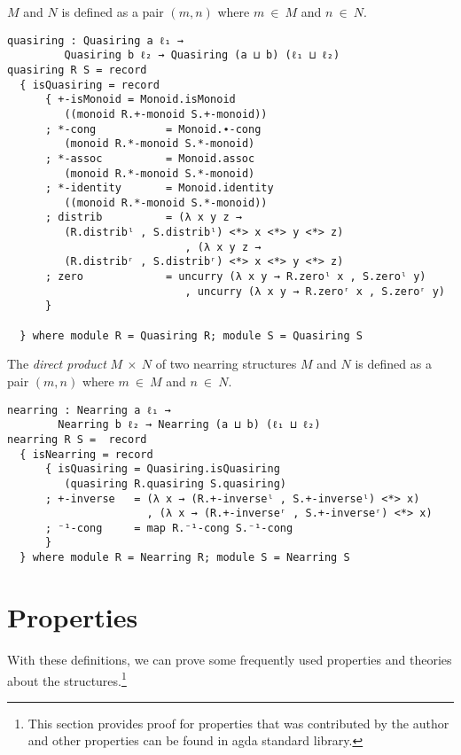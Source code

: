 $M$ and $N$ is defined as a pair $(m,n)$ where $m \ \in \ M$ and $n \ \in \ N$.
\begin{verbatim}
quasiring : Quasiring a ℓ₁ →
		 Quasiring b ℓ₂ → Quasiring (a ⊔ b) (ℓ₁ ⊔ ℓ₂)
quasiring R S = record
  { isQuasiring = record
      { +-isMonoid = Monoid.isMonoid
		 ((monoid R.+-monoid S.+-monoid))
      ; *-cong           = Monoid.∙-cong
		 (monoid R.*-monoid S.*-monoid)
      ; *-assoc          = Monoid.assoc
		 (monoid R.*-monoid S.*-monoid)
      ; *-identity       = Monoid.identity
		 ((monoid R.*-monoid S.*-monoid))
      ; distrib          = (λ x y z →
		 (R.distribˡ , S.distribˡ) <*> x <*> y <*> z)
                            , (λ x y z →
		 (R.distribʳ , S.distribʳ) <*> x <*> y <*> z)
      ; zero             = uncurry (λ x y → R.zeroˡ x , S.zeroˡ y)
                            , uncurry (λ x y → R.zeroʳ x , S.zeroʳ y)
      }

  } where module R = Quasiring R; module S = Quasiring S
\end{verbatim}
The \textit{direct product} $M \ \times \ N$ of two nearring structures
$M$ and $N$ is defined as a pair $(m,n)$ where $m \ \in \ M$ and $n \ \in \ N$.
\begin{verbatim}
nearring : Nearring a ℓ₁ → 
		Nearring b ℓ₂ → Nearring (a ⊔ b) (ℓ₁ ⊔ ℓ₂)
nearring R S =  record
  { isNearring = record
      { isQuasiring = Quasiring.isQuasiring
		 (quasiring R.quasiring S.quasiring)
      ; +-inverse   = (λ x → (R.+-inverseˡ , S.+-inverseˡ) <*> x)
                      , (λ x → (R.+-inverseʳ , S.+-inverseʳ) <*> x)
      ; ⁻¹-cong     = map R.⁻¹-cong S.⁻¹-cong
      }
  } where module R = Nearring R; module S = Nearring S
\end{verbatim}
\section{Properties}
With these definitions, we can prove some frequently used properties and theories
about the structures.\footnote{This section provides proof for properties that
was contributed by the author and other properties can be found in agda standard
library.}
